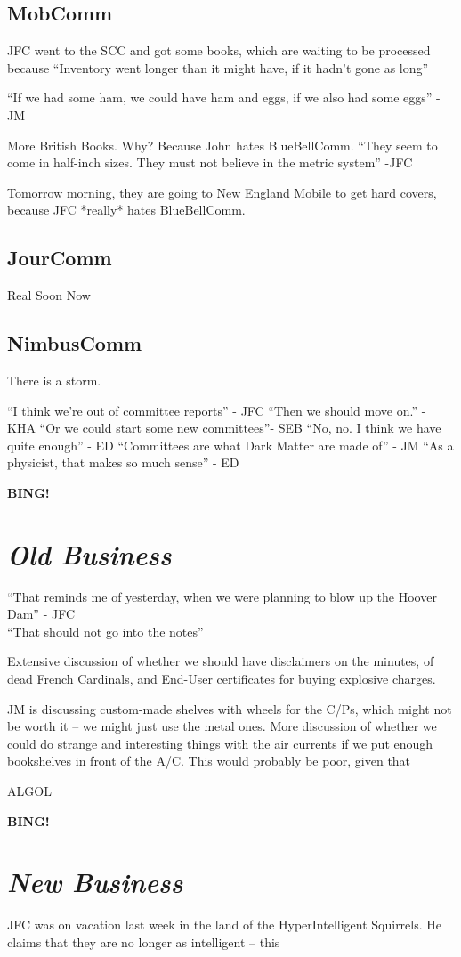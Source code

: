 \documentclass[10pt]{article}
\newcommand{\bing}{{\bf BING!} }
\newcommand{\goto}[1]{\bing \vskip 12pt \section*{{\em{#1}}}}
\begin{document}
\subsection*{MobComm}
JFC went to the SCC and got some books, which are waiting to be
processed because ``Inventory went longer than it might have, if it
hadn't gone as long''

``If we had some ham, we could have ham and eggs, if we also had some
eggs'' -JM

More British Books. Why? Because John hates BlueBellComm.
``They seem to come in half-inch sizes. They must not believe in the
metric system'' -JFC

Tomorrow morning, they are going to New England Mobile to get
hard covers, because JFC *really* hates BlueBellComm.

\subsection*{JourComm}
Real Soon Now

\subsection*{NimbusComm}
There is a storm.

``I think we're out of committee reports'' - JFC
``Then we should move on.'' - KHA
``Or we could start some new committees''- SEB
``No, no.  I think we have quite enough'' - ED
``Committees are what Dark Matter are made of'' - JM
``As a physicist, that makes so much sense'' - ED

\goto{Old Business}

``That reminds me of yesterday, when we were planning to blow up the
Hoover Dam'' - JFC\\
``That should not go into the notes'' 

Extensive discussion of whether we should have disclaimers on the
minutes, of dead French Cardinals, and End-User certificates for buying
explosive charges.

JM is discussing custom-made shelves with wheels for the C/Ps, which might not be
worth it -- we might just use the metal ones. More discussion of
whether we could do strange and interesting things with the air
currents if we put enough bookshelves in front of the A/C.  This would
probably be poor, given that 

ALGOL

\goto{New Business}
JFC was on vacation last week in the land of the HyperIntelligent
Squirrels. He claims that they are no longer as intelligent -- this 
\end{document}
